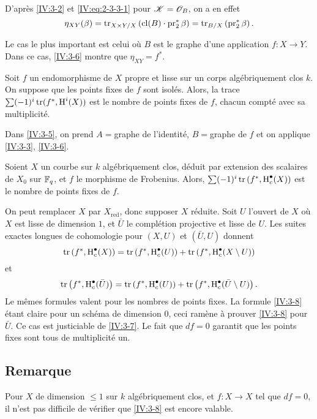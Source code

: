 D'après \ref{IV:3-2} et \eqref{IV:eq:2-3-3-1} pour $\mathscr{K}=\mathscr{O}_B$, on a en 
effet 
\[
  \eta_{X Y}(\beta) = \operatorname{tr}_{X\times Y/X}\left(\operatorname{cl}(B)\cdot \operatorname{pr}_2^\ast\beta\right) = \operatorname{tr}_{B/X}\left(\operatorname{pr}_2^\ast \beta\right) \text{.}
\]

Le cas le plus important est celui où $B$ est le graphe d'une application 
$f:X\to Y$. Dans ce cas, \ref{IV:3-6} montre que $\eta_{X Y}=f^\ast$. 





\begin{corollary_}\label{IV:3-7}
Soit $f$ un endomorphisme de $X$ propre et lisse sur un corps algébriquement 
clos $k$. On suppose que les points fixes de $f$ sont isolés. Alors, la 
trace $\sum (-1)^i \operatorname{tr}(f^\ast,\operatorname{H}^i(X))$ est le nombre de points fixes de $f$, 
chacun compté avec sa multiplicité.
\end{corollary_}

Dans \ref{IV:3-5}, on prend $A=$graphe de l'identité, $B=$graphe de $f$ et on 
applique \ref{IV:3-3}, \ref{IV:3-6}. 





\begin{corollary_}\label{IV:3-8}
Soient $X$ un courbe sur $k$ algébriquement clos, déduit par extension des 
scalaires de $X_0$ sur $\mathbb{F}_q$, et $f$ le morphisme de Frobenius. Alors, 
$\sum (-1)^i \operatorname{tr}\left(f^\ast,\operatorname{H}_c^\bullet(X)\right)$ est le nombre de points 
fixes de $f$.
\end{corollary_}

On peut remplacer $X$ par $X_\text{red}$, donc supposer $X$ réduite. Soit $U$ 
l'ouvert de $X$ où $X$ est lisse de dimension $1$, et $\bar U$ le 
complétion projective et lisse de $U$. Les suites exactes longues de 
cohomologie pour $(X,U)$ et $(\bar U,U)$ donnent 
\[
  \operatorname{tr}\left(f^\ast,\operatorname{H}_c^\bullet(X)\right) = \operatorname{tr}\left(f^\ast,\operatorname{H}_c^\bullet(U)\right) + \operatorname{tr}\left(f^\ast,\operatorname{H}_c^\bullet(X\setminus U)\right) 
\]
et
\[
  \operatorname{tr}\left(f^\ast,\operatorname{H}_c^\bullet(\bar U)\right) = \operatorname{tr}\left(f^\ast,\operatorname{H}_c^\bullet(U)\right) + \operatorname{tr}\left(f^\ast,\operatorname{H}_c^\bullet(\bar U\setminus U)\right) \text{.}
\]
Le mêmes formules valent pour les nombres de points fixes. La formule 
\ref{IV:3-8} étant claire pour un schéma de dimension $0$, ceci ramène 
à prouver \ref{IV:3-8} pour $\bar U$. Ce cas est justiciable de \ref{IV:3-7}. 
Le fait que $d f=0$ garantit que les points fixes sont tous de 
multiplicité un. 





\subsection{Remarque}\label{IV:3-9}

Pour $X$ de dimension $\leqslant 1$ sur $k$ algébriquement clos, et 
$f:X\to X$ tel que $d f=0$, il n'est pas difficile de vérifier que 
\ref{IV:3-8} est encore valable. 


